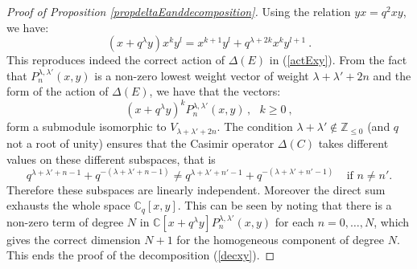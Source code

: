 \documentclass[a4paper,12pt]{article}
\numberwithin{equation}{section}
\newcommand{\C}{\mathbb{C}}
\theoremstyle{rem}
\theoremstyle{definition}
\begin{document}
\begin{proof}[Proof of Proposition \ref{propdeltaEanddecomposition}] Using the relation $yx=q^2xy$, we have:
\[(x+q^{\lambda}y)x^{k}y^l=x^{k+1}y^l+q^{\lambda+2k}x^ky^{l+1}\ .\]
This reproduces indeed the correct action of $\Delta(E)$ in (\ref{actExy}). From the fact that $P_n^{\lambda,\lambda'}(x,y)$ is a non-zero lowest weight vector of weight $\lambda+\lambda'+2n$ and the form of the action of $\Delta(E)$, we have that the vectors:
\[(x+q^{\lambda}y)^kP_n^{\lambda,\lambda'}(x,y)\,,\ \ \ k\geq 0\ ,\]
form a submodule isomorphic to $V_{\lambda+\lambda'+2n}$. The condition $\lambda+\lambda'\notin \mathbb{Z}_{\leq 0}$ (and $q$ not a root of unity) ensures that the Casimir operator $\Delta(C)$ takes different values on these different subspaces, that is
\[q^{\lambda+\lambda'+n-1}+q^{-(\lambda+\lambda'+n-1)}\neq q^{\lambda+\lambda'+n'-1}+q^{-(\lambda+\lambda'+n'-1)}\ \ \ \ \ \text{if $n\neq n'$.}\]
Therefore these subspaces are linearly independent. Moreover the direct sum exhausts the whole space $\C_q[x,y]$. This can be seen by noting that there is a non-zero term of degree $N$ in $\C[x+q^\lambda y] P_n^{\lambda,\lambda'}(x,y)$ for each $n=0,\dots,N$, which gives the correct dimension $N+1$ for the homogeneous component of degree $N$. This ends the proof of the decomposition (\ref{decxy}).
\end{proof}
\end{document}
